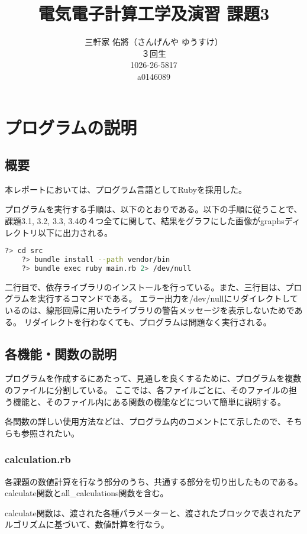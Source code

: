 \documentclass[11pt]{jsarticle}
\title{電気電子計算工学及演習 課題3}
\author{三軒家 佑將（さんげんや ゆうすけ） \\ ３回生 \\ 1026-26-5817 \\ a0146089}
\date{}
\begin{document}
    \maketitle
    
    \section{プログラムの説明}
        \subsection{概要}
            本レポートにおいては、プログラム言語としてRubyを採用した。

            プログラムを実行する手順は、以下のとおりである。以下の手順に従うことで、課題3.1, 3.2, 3.3, 3.4の４つ全てに関して、結果をグラフにした画像がgraphsディレクトリ以下に出力される。
            \begin{lstlisting}[language=bash]
    ?> cd src
    ?> bundle install --path vendor/bin
    ?> bundle exec ruby main.rb 2> /dev/null
            \end{lstlisting}
            二行目で、依存ライブラリのインストールを行っている。また、三行目は、プログラムを実行するコマンドである。
            エラー出力を/dev/nullにリダイレクトしているのは、線形回帰に用いたライブラリの警告メッセージを表示しないためである。
            リダイレクトを行わなくても、プログラムは問題なく実行される。

        \subsection{各機能・関数の説明}
            プログラムを作成するにあたって、見通しを良くするために、プログラムを複数のファイルに分割している。
            ここでは、各ファイルごとに、そのファイルの担う機能と、そのファイル内にある関数の機能などについて簡単に説明する。

            各関数の詳しい使用方法などは、プログラム内のコメントにて示したので、そちらも参照されたい。

            \subsubsection*{calculation.rb}
                各課題の数値計算を行なう部分のうち、共通する部分を切り出したものである。calculate関数とall\_calculations関数を含む。

                calculate関数は、渡された各種パラメーターと、渡されたブロックで表されたアルゴリズムに基づいて、数値計算を行なう。
\end{document}
